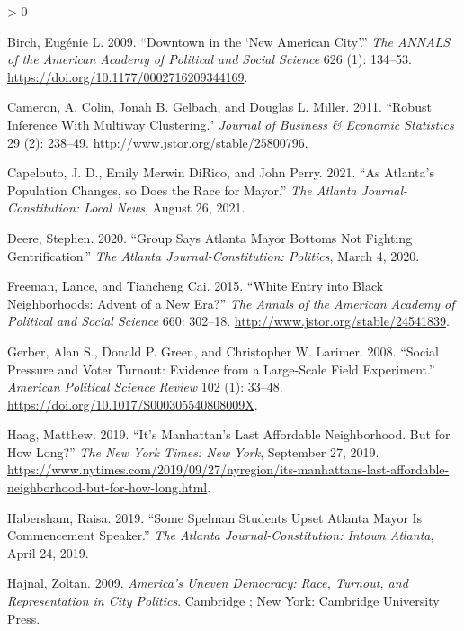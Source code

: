 \documentclass[
  12pt,
]{article}
\newlength{\cslhangindent}
\newenvironment{CSLReferences}[2] %
 {%
  \setlength{\parindent}{0pt}
  \ifodd #1 \everypar{\setlength{\hangindent}{\cslhangindent}}\ignorespaces\fi
  \ifnum #2 > 0
  \setlength{\parskip}{#2\baselineskip}
  \fi
 }%
 {}
\begin{document}
\begin{CSLReferences}{1}{0}
\leavevmode\hypertarget{ref-Birch2009}{}%
Birch, Eugénie L. 2009. {``Downtown in the {`{New American City}'}.''} \emph{The ANNALS of the American Academy of Political and Social Science} 626 (1): 134--53. \url{https://doi.org/10.1177/0002716209344169}.

\leavevmode\hypertarget{ref-Cameron2011}{}%
Cameron, A. Colin, Jonah B. Gelbach, and Douglas L. Miller. 2011. {``Robust {Inference With Multiway Clustering}.''} \emph{Journal of Business \& Economic Statistics} 29 (2): 238--49. \url{http://www.jstor.org/stable/25800796}.

\leavevmode\hypertarget{ref-Capelouto2021}{}%
Capelouto, J. D., Emily Merwin DiRico, and John Perry. 2021. {``As {Atlanta}'s Population Changes, so Does the Race for Mayor.''} \emph{The Atlanta Journal-Constitution: Local News}, August 26, 2021.

\leavevmode\hypertarget{ref-Deere2020}{}%
Deere, Stephen. 2020. {``Group Says {Atlanta Mayor Bottoms} Not Fighting Gentrification.''} \emph{The Atlanta Journal-Constitution: Politics}, March 4, 2020.

\leavevmode\hypertarget{ref-Freeman2015}{}%
Freeman, Lance, and Tiancheng Cai. 2015. {``White {Entry} into {Black Neighborhoods}: {Advent} of a {New Era}?''} \emph{The Annals of the American Academy of Political and Social Science} 660: 302--18. \url{http://www.jstor.org/stable/24541839}.

\leavevmode\hypertarget{ref-Gerber2008}{}%
Gerber, Alan S., Donald P. Green, and Christopher W. Larimer. 2008. {``Social {Pressure} and {Voter Turnout}: {Evidence} from a {Large-Scale Field Experiment}.''} \emph{American Political Science Review} 102 (1): 33--48. \url{https://doi.org/10.1017/S000305540808009X}.

\leavevmode\hypertarget{ref-Haag2019}{}%
Haag, Matthew. 2019. {``It's {Manhattan}'s {Last Affordable Neighborhood}. {But} for {How Long}?''} \emph{The New York Times: New York}, September 27, 2019. \url{https://www.nytimes.com/2019/09/27/nyregion/its-manhattans-last-affordable-neighborhood-but-for-how-long.html}.

\leavevmode\hypertarget{ref-Habersham2019}{}%
Habersham, Raisa. 2019. {``Some {Spelman} Students Upset {Atlanta} Mayor Is Commencement Speaker.''} \emph{The Atlanta Journal-Constitution: Intown Atlanta}, April 24, 2019.

\leavevmode\hypertarget{ref-Hajnal2009}{}%
Hajnal, Zoltan. 2009. \emph{America's Uneven Democracy: Race, Turnout, and Representation in City Politics}. {Cambridge ; New York}: {Cambridge University Press}.


\end{CSLReferences}
\end{document}
